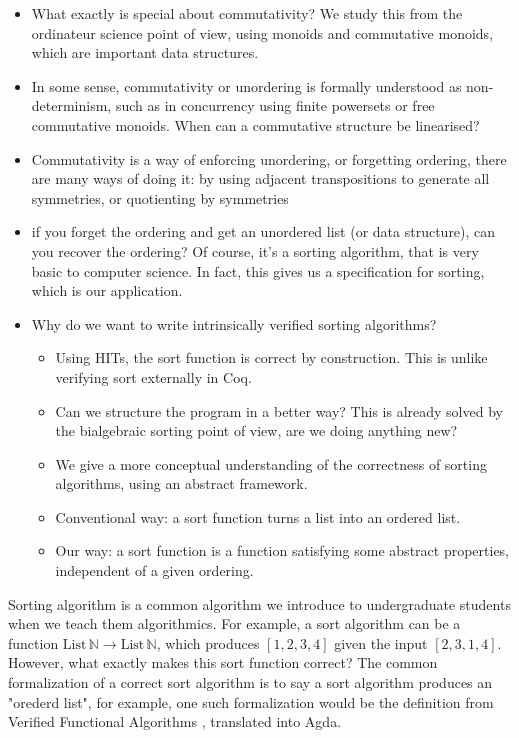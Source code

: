 \begin{itemize}
    \item What exactly is special about commutativity? We study this from the ordinateur science point of view, using monoids and commutative monoids, which are important data structures.
    \item In some sense, commutativity or unordering is formally understood as non-determinism, such as in concurrency using finite powersets or free commutative monoids. When can a commutative structure be linearised?
    \item Commutativity is a way of enforcing unordering, or forgetting ordering, there are many ways of doing it: by using adjacent transpositions to generate all symmetries, or quotienting by symmetries
    \item if you forget the ordering and get an unordered list (or data structure), can you recover the ordering? Of course, it's a sorting algorithm, that is very basic to computer science. In fact, this gives us a specification for sorting, which is our application.
    \item Why do we want to write intrinsically verified sorting algorithms?
        \begin{itemize}
        \item Using HITs, the sort function is correct by construction. This is unlike verifying 
            sort externally in Coq.
        \item Can we structure the program in a better way? This is already solved by the bialgebraic sorting point of view, are we doing anything new?
        \item We give a more conceptual understanding of the correctness of sorting algorithms, using an abstract framework.      
        \item Conventional way: a sort function turns a list into an ordered list.
        \item Our way: a sort function is a function satisfying some abstract properties, independent of a given ordering.
        \end{itemize}            
\end{itemize}



Sorting algorithm is a common algorithm we introduce to undergraduate students
when we teach them algorithmics. For example, a sort algorithm can be a function
$\text{List} \, \mathbb{N} \to \text{List} \, \mathbb{N}$, which produces $[1,2,3,4]$
given the input $[2,3,1,4]$. However, what exactly makes this sort function correct?
The common formalization of a correct sort algorithm is to say a sort algorithm produces
an "orederd list", for example, one such formalization would be the definition
from Verified Functional Algorithms \cite{appel2016verified}, translated into Agda.

